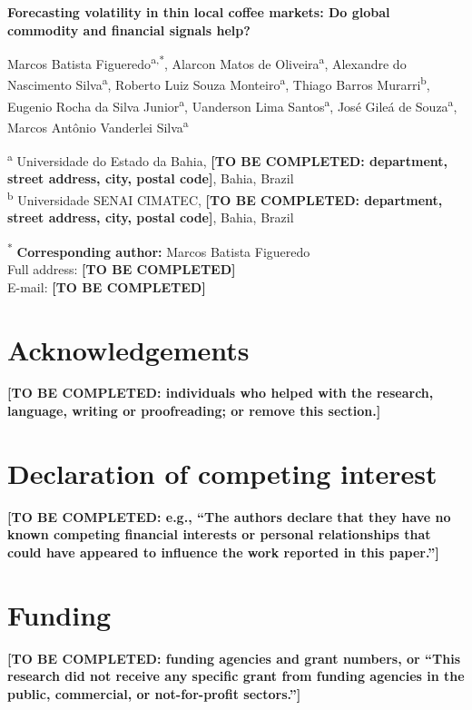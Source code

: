 \documentclass[11pt,a4paper]{article}
\begin{document}
\begin{center}
{\Large\bfseries Forecasting volatility in thin local coffee markets: Do global commodity and financial signals help?\par}
\vspace{1em}

Marcos Batista Figueredo\textsuperscript{a,*},
Alarcon Matos de Oliveira\textsuperscript{a},
Alexandre do Nascimento Silva\textsuperscript{a},
Roberto Luiz Souza Monteiro\textsuperscript{a},
Thiago Barros Murarri\textsuperscript{b},
Eugenio Rocha da Silva Junior\textsuperscript{a},
Uanderson Lima Santos\textsuperscript{a},
José Gileá de Souza\textsuperscript{a},
Marcos Antônio Vanderlei Silva\textsuperscript{a}
\end{center}

\textsuperscript{a} Universidade do Estado da Bahia, \textbf{[TO BE COMPLETED: department, street address, city, postal code]}, Bahia, Brazil\\
\textsuperscript{b} Universidade SENAI CIMATEC, \textbf{[TO BE COMPLETED: department, street address, city, postal code]}, Bahia, Brazil

\textsuperscript{*} \textbf{Corresponding author:} Marcos Batista Figueredo\\
Full address: \textbf{[TO BE COMPLETED]}\\
E-mail: \textbf{[TO BE COMPLETED]}

\section*{Acknowledgements}
\textbf{[TO BE COMPLETED: individuals who helped with the research, language, writing or proofreading; or remove this section.]}

\section*{Declaration of competing interest}
\textbf{[TO BE COMPLETED: e.g., ``The authors declare that they have no known competing financial interests or personal relationships that could have appeared to influence the work reported in this paper.'']}

\section*{Funding}
\textbf{[TO BE COMPLETED: funding agencies and grant numbers, or ``This research did not receive any specific grant from funding agencies in the public, commercial, or not-for-profit sectors.'']}
\end{document}
